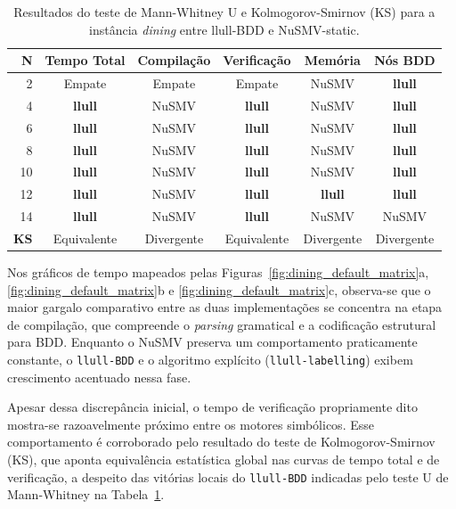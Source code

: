\documentclass[cic,tc]{infufrgs}
\begin{document}
	\begin{table}[htbp]
		\centering
		\caption{Resultados do teste de Mann-Whitney U e Kolmogorov-Smirnov (KS) para a instância \textit{dining} entre llull-BDD e NuSMV-static.}
		\label{tab:estatistica_dining_default}
		\small
		\begin{tabular}{rccccc}
			\toprule
			\textbf{N} & \textbf{Tempo Total} & \textbf{Compilação} & \textbf{Verificação} & \textbf{Memória} & \textbf{Nós BDD} \\
			\midrule
			2  & Empate      & Empate       & Empate      & NuSMV       & \textbf{llull} \\
			4  & \textbf{llull} & NuSMV       & \textbf{llull} & NuSMV       & \textbf{llull} \\
			6  & \textbf{llull} & NuSMV       & \textbf{llull} & NuSMV       & \textbf{llull} \\
			8  & \textbf{llull} & NuSMV       & \textbf{llull} & NuSMV       & \textbf{llull} \\
			10 & \textbf{llull} & NuSMV       & \textbf{llull} & NuSMV       & \textbf{llull} \\
			12 & \textbf{llull} & NuSMV       & \textbf{llull} & \textbf{llull} & \textbf{llull} \\
			14 & \textbf{llull} & NuSMV       & \textbf{llull} & NuSMV       & NuSMV \\
			\midrule
			\textbf{KS} & Equivalente & Divergente & Equivalente & Divergente & Divergente \\
			\bottomrule
		\end{tabular}
	\end{table}
	\FloatBarrier
	Nos gráficos de tempo mapeados pelas Figuras~\ref{fig:dining_default_matrix}a, \ref{fig:dining_default_matrix}b e \ref{fig:dining_default_matrix}c, observa-se que o maior gargalo comparativo entre as duas implementações se concentra na etapa de compilação, que compreende o \textit{parsing} gramatical e a codificação estrutural para BDD. Enquanto o NuSMV preserva um comportamento praticamente constante, o \texttt{llull-BDD} e o algoritmo explícito (\texttt{llull-labelling}) exibem crescimento acentuado nessa fase. 
	
	Apesar dessa discrepância inicial, o tempo de verificação propriamente dito mostra-se razoavelmente próximo entre os motores simbólicos. Esse comportamento é corroborado pelo resultado do teste de Kolmogorov-Smirnov (KS), que aponta equivalência estatística global nas curvas de tempo total e de verificação, a despeito das vitórias locais do \texttt{llull-BDD} indicadas pelo teste U de Mann-Whitney na Tabela~\ref{tab:estatistica_dining_default}.
	
\end{document}
